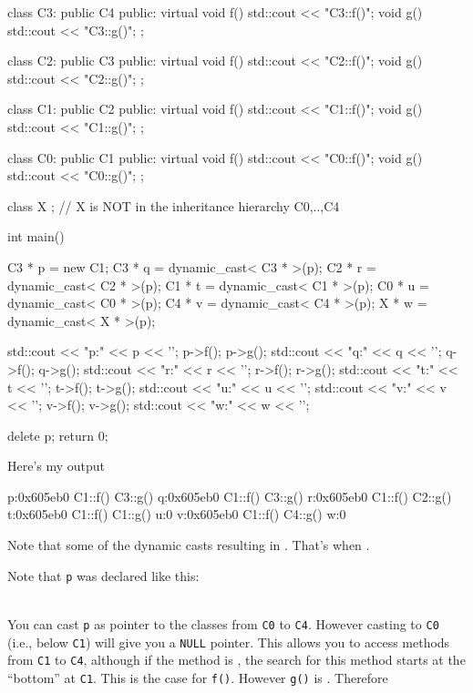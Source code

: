 \begin{consolethree}[escapeinside=||]
\begin{console}
class C3: public C4
{
public:
     virtual void f() { std::cout << "C3::f()\n"; }
     void g() { std::cout << "C3::g()\n"; }
};

class C2: public C3
{
public:
     virtual void f() { std::cout << "C2::f()\n"; }
     void g() { std::cout << "C2::g()\n"; }
};

class C1: public C2
{
public:
     virtual void f() { std::cout << "C1::f()\n"; }
     void g() { std::cout << "C1::g()\n"; }
};

class C0: public C1
{
public:
     virtual void f() { std::cout << "C0::f()\n"; }
     void g() { std::cout << "C0::g()\n"; }
};

class X {}; // X is NOT in the inheritance hierarchy C0,..,C4

int main()
{   
    C3 * p = new C1;
    C3 * q = dynamic_cast< C3 * >(p);
    C2 * r = dynamic_cast< C2 * >(p);
    C1 * t = dynamic_cast< C1 * >(p);
    C0 * u = dynamic_cast< C0 * >(p);
    C4 * v = dynamic_cast< C4 * >(p);
    X * w = dynamic_cast< X * >(p);
    
    std::cout << "p:" << p << '\n'; p->f(); p->g();
    std::cout << "q:" << q << '\n'; q->f(); q->g();
    std::cout << "r:" << r << '\n'; r->f(); r->g();
    std::cout << "t:" << t << '\n'; t->f(); t->g();
    std::cout << "u:" << u << '\n';
    std::cout << "v:" << v << '\n'; v->f(); v->g();
    std::cout << "w:" << w << '\n';

    delete p;
    return 0;
}
\end{console}

Here's my output

\begin{console}
p:0x605eb0
C1::f()
C3::g()
q:0x605eb0
C1::f()
C3::g()
r:0x605eb0
C1::f()
C2::g()
t:0x605eb0
C1::f()
C1::g()
u:0
v:0x605eb0
C1::f()
C4::g()
w:0
\end{console}

Note that some of the dynamic casts resulting in
\texttt{}. That's when .

Note that \texttt{p} was declared like this:

\\

You can cast \texttt{p} as pointer to the classes from \texttt{C0} to \texttt{C4}. However casting to \texttt{C0 }(i.e., below \texttt{C1}) will give you a \texttt{NULL} pointer. This allows you to access methods from \texttt{C1} to \texttt{C4}, although if the method is , the search for this method starts at the ``bottom'' at \texttt{C1}. This is the case for \texttt{f()}. However \texttt{g()} is . Therefore


\end{consolethree}
